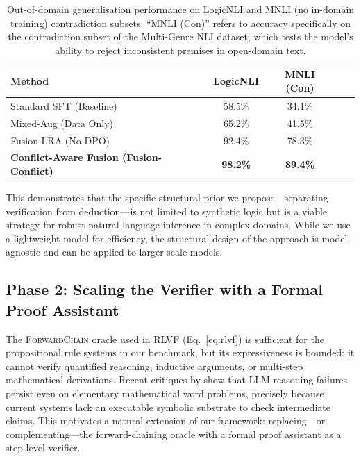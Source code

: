 \documentclass{article} %
\begin{document}
\begin{table}[h]
    \centering
    \begin{tabular}{lcccc}
        \toprule
        \textbf{Method} & \textbf{LogicNLI} & \textbf{MNLI (Con)} \\
        \midrule
        Standard SFT (Baseline) & 58.5\% & 34.1\% \\
        Mixed-Aug (Data Only) & 65.2\% & 41.5\% \\
        Fusion-LRA (No DPO) & 92.4\% & 78.3\% \\
        \rowcolor{gray!10} \textbf{Conflict-Aware Fusion (Fusion-Conflict)} & \textbf{98.2\%} & \textbf{89.4\%} \\
        \bottomrule
    \end{tabular}
    \caption{Out-of-domain generalisation performance on LogicNLI and MNLI (no in-domain training) contradiction subsets. ``MNLI (Con)'' refers to accuracy specifically on the contradiction subset of the Multi-Genre NLI dataset, which tests the model's ability to reject inconsistent premises in open-domain text.}
    \label{tab:real_world_results}
\end{table}

This demonstrates that the specific structural prior we propose---separating verification from deduction---is not limited to synthetic logic but is a viable strategy for robust natural language inference in complex domains. While we use a lightweight model for efficiency, the structural design of the approach is model-agnostic and can be applied to larger-scale models.

\subsection{Phase 2: Scaling the Verifier with a Formal Proof Assistant}
\label{sec:phase2}

The \textsc{ForwardChain} oracle used in RLVF (Eq.~\ref{eq:rlvf}) is sufficient for the propositional rule systems in our benchmark, but its expressiveness is bounded: it cannot verify quantified reasoning, inductive arguments, or multi-step mathematical derivations. Recent critiques by \citet{davis2024benchmarks,davis2024mathematics,davis2024gpt4o1} show that LLM reasoning failures persist even on elementary mathematical word problems, precisely because current systems lack an executable symbolic substrate to check intermediate claims. This motivates a natural extension of our framework: replacing---or complementing---the forward-chaining oracle with a formal proof assistant as a step-level verifier.
\end{document}
